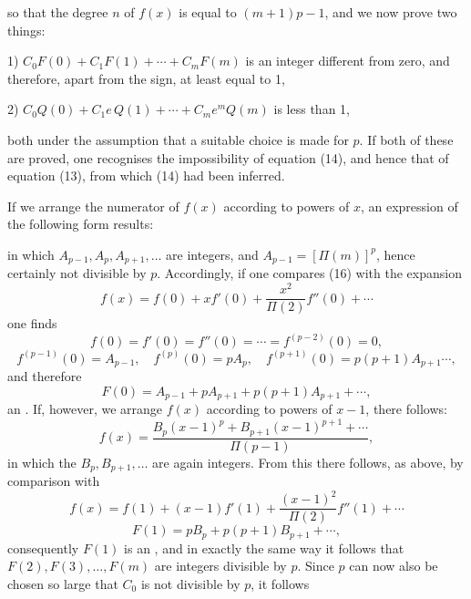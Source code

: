 so that the degree $n$ of $f(x)$ is equal to $(m+1)p-1$, and we now prove two things:

1) $C_0 F(0) + C_1 F(1) + \cdots + C_m F(m)$ is an integer different from zero, and therefore, apart from the sign, at least equal to 1,

2) $C_0 Q(0) + C_1 e\,Q(1) + \cdots + C_m e^m Q(m)$ is less than 1,

both under the assumption that a suitable choice is made for $p$. If both of these are proved, one recognises the impossibility of equation (14), and hence that of equation (13), from which (14) had been inferred.

If we arrange the numerator of $f(x)$ according to powers of $x$, an expression of the following form results:


in which $A_{p-1}, A_p, A_{p+1}, \ldots$ are integers, and $A_{p-1}=[\Pi(m)]^p$, hence certainly not divisible by $p$. Accordingly, if one compares (16) with the  expansion
\[
f(x) = f(0) + xf'(0) + \frac{x^2}{\Pi(2)}f''(0)+\cdots
\]
one finds
\[
f(0)=f'(0)=f''(0)=\cdots=f^{(p-2)}(0)=0,
\]
\[
f^{(p-1)}(0)=A_{p-1},\quad f^{(p)}(0)=pA_p,\quad f^{(p+1)}(0)=p(p+1)A_{p+1}\cdots,
\]
and therefore
\[
F(0) = A_{p-1}+pA_{p+1}+p(p+1)A_{p+1}+\cdots, %
\]
an . If, however, we arrange $f(x)$ according to powers of $x-1$, there follows:
\[
f(x) = \frac{B_p(x-1)^p+B_{p+1}(x-1)^{p+1}+\cdots}{\Pi(p-1)},
\]
in which the $B_p, B_{p+1}, \ldots$ are again integers. From this there follows, as above, by comparison with
\[
f(x) = f(1) + (x-1)f'(1) + \frac{(x-1)^2}{\Pi(2)}f''(1)+\cdots
\]
\[
F(1) = pB_p + p(p+1)B_{p+1}+\cdots,
\]
consequently $F(1)$ is an , and in exactly the same way it follows that $F(2), F(3), \ldots, F(m)$ are integers divisible by $p$. Since $p$ can now also be chosen so large that $C_0$ is not divisible by $p$, it follows

